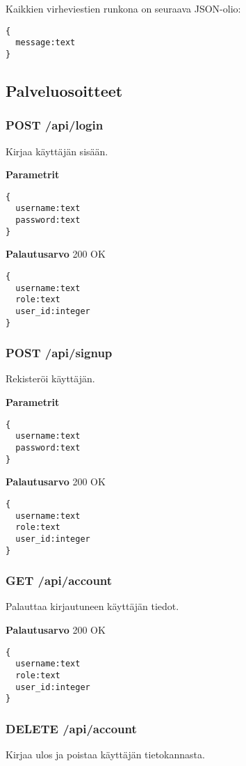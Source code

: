 Kaikkien virheviestien runkona on seuraava JSON-olio:
\begin{Verbatim}
{
  message:text
}
\end{Verbatim}

\subsection{Palveluosoitteet}

\subsubsection{POST /api/login}
Kirjaa käyttäjän sisään.

\textbf{Parametrit}
\begin{Verbatim}
{
  username:text
  password:text
}
\end{Verbatim}

\textbf{Palautusarvo}
200 OK
\begin{Verbatim}
{
  username:text
  role:text
  user_id:integer
}
\end{Verbatim}

\subsubsection{POST /api/signup}
Rekisteröi käyttäjän.

\textbf{Parametrit}
\begin{Verbatim}
{
  username:text
  password:text
}
\end{Verbatim}

\textbf{Palautusarvo}
200 OK
\begin{Verbatim}
{
  username:text
  role:text
  user_id:integer
}
\end{Verbatim}

\subsubsection{GET /api/account}
Palauttaa kirjautuneen käyttäjän tiedot.

\textbf{Palautusarvo}
200 OK
\begin{Verbatim}
{
  username:text
  role:text
  user_id:integer
}
\end{Verbatim}

\subsubsection{DELETE /api/account}
Kirjaa ulos ja poistaa käyttäjän tietokannasta.

